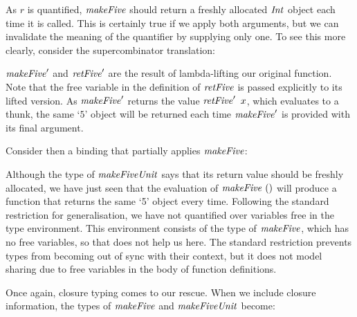 
As $r$ is quantified, $\operatorname{\mathit{makeFive}}$ should return a freshly allocated $\operatorname{\mathit{Int}}$ object each time it is called. This is certainly true if we apply both arguments, but we can invalidate the meaning of the quantifier by supplying only one. To see this more clearly, consider the supercombinator translation:


\vspace{-1ex}

$\operatorname{\mathit{makeFive}}'$ and $\operatorname{\mathit{retFive}}'$ are the result of lambda-lifting \cite{johnsson:lambda-lifting} our original function. Note that the free variable in the definition of $\operatorname{\mathit{retFive}}$ is passed explicitly to its lifted version. As $\operatorname{\mathit{makeFive}}'$ returns the value $\operatorname{\mathit{retFive}}' \ x$, which evaluates to a thunk, the same `$5$' object will be returned each time $\operatorname{\mathit{makeFive}}'$ is provided with its final argument. 

Consider then a binding that partially applies $\operatorname{\mathit{makeFive}}$:


Although the type of $\operatorname{\mathit{makeFiveUnit}}$ says that its return value should be freshly allocated, we have just seen that the evaluation of  $\operatorname{\mathit{makeFive}} \ ()$ will produce a function that returns the same `5' object every time. Following the standard restriction for generalisation, we have not quantified over variables free in the type environment. This environment consists of the type of $\operatorname{\mathit{makeFive}}$, which has no free variables, so that does not help us here. The standard restriction prevents types from becoming out of sync with their context, but it does not model sharing due to free variables in the body of function definitions.

Once again, closure typing comes to our rescue. When we include closure information, the types of $\operatorname{\mathit{makeFive}}$ and $\operatorname{\mathit{makeFiveUnit}}$ become:


